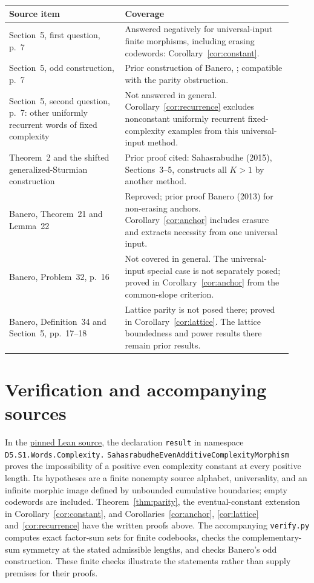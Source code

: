 \documentclass[11pt]{article}
\begin{document}
\begin{center}\small
\begin{tabular}{@{}p{0.38\linewidth}p{0.55\linewidth}@{}}
\toprule
Source item & Coverage\\
\midrule
Section~5, first question, p.~7 & Answered negatively for universal-input
finite morphisms, including erasing codewords: Corollary~\ref{cor:constant}.\\[3pt]
Section~5, odd construction, p.~7 & Prior construction of Banero,
\cite[Theorem~33]{banero}; compatible with the parity obstruction.\\[3pt]
Section~5, second question, p.~7: other uniformly recurrent words of fixed
complexity & Not answered in general. Corollary~\ref{cor:recurrence}
excludes nonconstant uniformly recurrent fixed-complexity examples from
this universal-input method.\\[3pt]
Theorem~2 and the shifted generalized-Sturmian construction & Prior proof
cited: Sahasrabudhe (2015), Sections~3--5, constructs all $K>1$ by another
method.\\[3pt]
Banero, Theorem~21 and Lemma~22 & Reproved; prior proof Banero (2013)
for non-erasing anchors. Corollary~\ref{cor:anchor} includes erasure and
extracts necessity from one universal input.\\[3pt]
Banero, Problem~32, p.~16 & Not covered in general. The universal-input
special case is not separately posed; proved in
Corollary~\ref{cor:anchor} from the common-slope criterion.\\[3pt]
Banero, Definition~34 and Section~5, pp.~17--18 & Lattice parity is not
posed there; proved in Corollary~\ref{cor:lattice}. The lattice
boundedness and power results there remain prior results.\\
\bottomrule
\end{tabular}
\end{center}

\section{Verification and accompanying sources}
In the \href{https://github.com/the-omega-institute/trureturing/blob/ea30c256f9857dcf2582db122a9570836d8a5f18/D5/S1/Words/Complexity/SahasrabudheEvenAdditiveComplexityMorphism.lean}{pinned Lean source},
the declaration \texttt{result} in namespace
\texttt{D5.S1.Words.Complexity.}\allowbreak
\texttt{SahasrabudheEvenAdditiveComplexityMorphism}
proves the impossibility of a positive even complexity constant at every
positive length. Its hypotheses are a finite nonempty source alphabet,
universality, and an infinite morphic image defined by unbounded
cumulative boundaries; empty codewords are included.
Theorem~\ref{thm:parity}, the eventual-constant extension in
Corollary~\ref{cor:constant}, and Corollaries~\ref{cor:anchor},
\ref{cor:lattice} and~\ref{cor:recurrence} have the written proofs above.
The accompanying \texttt{verify.py} computes exact
factor-sum sets for finite codebooks, checks the complementary-sum
symmetry at the stated admissible lengths, and checks Banero's odd
construction. These finite checks illustrate the statements rather
than supply premises for their proofs.
\end{document}
